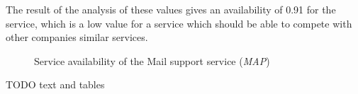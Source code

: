 %
The result of the analysis of these values gives an availability of 0.91 for the service, which is a low value for a service which should be able to compete with other companies similar services.
\begin{center}
	\begin{figure}[H]
		\centering
		\setlength\fboxsep{7pt}
		\setlength\fboxrule{0.5pt}
		\caption{Service availability of the Mail support service (\emph{MAP})}
		\label{fig:map_support_mail_availability}
	\end{figure}
\end{center}
TODO text and tables\\\\
%
